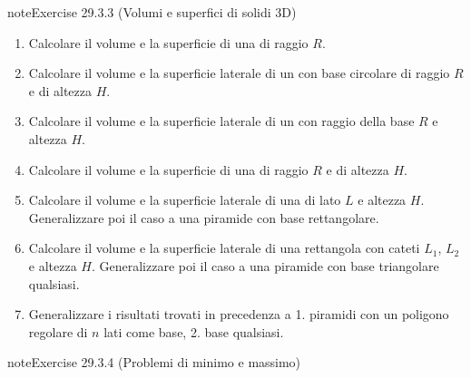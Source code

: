 \documentclass[letterpaper,10pt,italian]{jupyterBook}
\begin{document}
\begin{sphinxadmonition}{note}{Exercise 29.3.3 (Volumi e superfici di solidi \sphinxhyphen{} 3D)}


\begin{enumerate}
%
\item {} 
\sphinxAtStartPar
Calcolare il volume e la superficie di una  di raggio \(R\). 

\item {} 
\sphinxAtStartPar
Calcolare il volume e la superficie laterale di un  con base circolare di raggio \(R\) e di altezza \(H\).

\item {} 
\sphinxAtStartPar
Calcolare il volume e la superficie laterale di un  con raggio della base \(R\) e altezza \(H\).

\item {} 
\sphinxAtStartPar
Calcolare il volume e la superficie di una  di raggio \(R\) e di altezza \(H\).

\item {} 
\sphinxAtStartPar
Calcolare il volume e la superficie laterale di una  di lato \(L\) e altezza \(H\). Generalizzare poi il caso a una piramide con base rettangolare.

\item {} 
\sphinxAtStartPar
Calcolare il volume e la superficie laterale di una  rettangola con cateti \(L_1\), \(L_2\) e altezza \(H\). Generalizzare poi il caso a una piramide con base triangolare qualsiasi.

\item {} 
\sphinxAtStartPar
Generalizzare i risultati trovati in precedenza a 1. piramidi con un poligono regolare di \(n\) lati come base, 2. base qualsiasi.

\end{enumerate}
\end{sphinxadmonition}
 \label{exercise:ch/vector-calculus/problems-exercise-3}

\begin{sphinxadmonition}{note}{Exercise 29.3.4 (Problemi di minimo e massimo)}


\end{sphinxadmonition}
\end{document}
